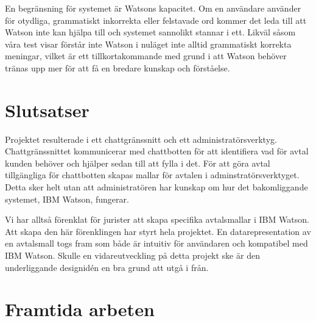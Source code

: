 \documentclass[a4paper,12pt]{article}
\begin{document}



En begränsning för systemet är Watsons kapacitet. Om en användare använder för otydliga, grammatiskt inkorrekta eller felstavade ord kommer det leda till att Watson inte kan hjälpa till och systemet sannolikt stannar i ett. Likväl såsom våra test visar förstår inte Watson i nuläget inte alltid grammatiskt korrekta meningar, vilket är ett tillkortakommande med grund i att Watson behöver tränas upp mer för att få en bredare kunskap och förståelse.  


\section{Slutsatser}
Projektet resulterade i ett chatt\-gränss\-nitt och ett administratörsverktyg. Chattgräns\-snittet kommunicerar med chattbotten för att identifiera vad för avtal kunden behöver och hjälper sedan till att fylla i det. För att göra avtal tillgängliga för chattbotten skapas mallar för avtalen i adminstratörsverktyget. Detta sker helt utan att administratören har kunskap om hur det bakomliggande systemet, IBM Watson, fungerar. 



Vi har alltså förenklat för jurister att skapa specifika avtalsmallar i IBM Watson. Att skapa den här förenklingen har styrt hela projektet. En datarepresentation av en avtalsmall togs fram som både är intuitiv för användaren och kompatibel med IBM Watson. Skulle en vidareutveckling på detta projekt ske är den underliggande designidén en bra grund att utgå i från. 


\section{Framtida arbeten}
\end{document}
